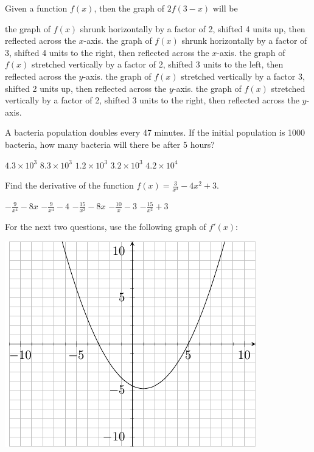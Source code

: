 \documentclass[11pt]{article}
\begin{document}
\begin{questions}
\begin{multiplechoice}{5}
\question Given a function $f(x)$, then the graph of $2f\left(3 - x\right)$ will be
\begin{answers}{2}
\ans the graph of $f(x)$ shrunk horizontally by a factor of 2, shifted 4 units up, then reflected across the $x$-axis.
\ans the graph of $f(x)$ shrunk horizontally by a factor of 3, shifted 4 units to the right, then reflected across the $x$-axis.
\ans the graph of $f(x)$ stretched vertically by a factor of 2, shifted 3 units to the left, then reflected across the $y$-axis.
\ans the graph of $f(x)$ stretched vertically by a factor 3, shifted 2 units up, then reflected across the $y$-axis.
\ans the graph of $f(x)$ stretched vertically by a factor of 2, shifted 3 units to the right, then reflected across the $y$-axis.
\end{answers}



\question A bacteria population doubles every 47 minutes.  If the initial population is 1000 bacteria, how many bacteria will there be after 5 hours?
\begin{answers}{3}
\ans $4.3 \times 10^3$
\ans $8.3 \times 10^3$
\ans $1.2 \times 10^3$
\ans $3.2 \times 10^3$
\ans $4.2 \times 10^4$
\end{answers}



\question Find the derivative of the function $f(x) = \frac{3}{x^3} - 4x^2 + 3$.
\begin{answers}{2}
\ans $-\frac{9}{x^4} -8x$
\ans $-\frac{9}{x^4} - 4$
\ans $-\frac{15}{x^2} - 8x$
\ans $-\frac{10}{x} - 3$
\ans $-\frac{15}{x^2} + 3$
\end{answers}

\newpage


For the next two questions, use the following graph of $f'(x)$:\\


\begin{minipage}{\linewidth}%
\centering
\makebox[\linewidth]{}
\includegraphics{finalgraph3.pdf}
\label{graph1exam1}%
\end{minipage}



\end{multiplechoice}
\end{questions}
\end{document}
